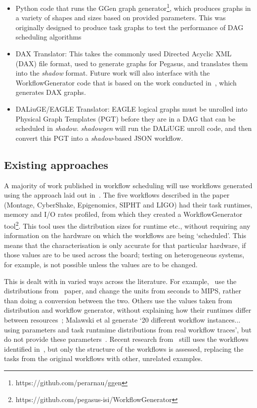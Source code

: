 \documentclass{article}
\begin{document}
\begin{multicols}{2}
\begin{itemize}
	\item Python code that runs the GGen graph
	generator\footnote{https://github.com/perarnau/ggen}, which produces graphs in a variety of shapes and sizes based on provided parameters. This was originally designed to produce task graphs to test the performance of DAG scheduling algorithms
	\item DAX Translator: This takes the commonly used Directed Acyclic XML (DAX)
	file format, used to generate graphs for Pegasus, and translates them into
	the \textit{shadow} format. Future work will also interface with the
	WorkflowGenerator code that is based on the work conducted
	in~\cite{bharathi2008}, which generates DAX graphs. 
	\item DALiuGE/EAGLE Translator: EAGLE logical graphs must be unrolled into
	Physical Graph Templates (PGT) before they are in a DAG that can be scheduled in
	\textit{shadow}. \textit{shadowgen} will run the DALiUGE unroll code, and then
	convert this PGT into a \textit{shadow}-based JSON workflow. 
\end{itemize}


\subsection*{Existing approaches}
\label{ssec:existing}
A majority of work published in workflow scheduling will use workflows
generated using the approach laid out in~\cite{bharathi2008}. The five
workflows described in the paper (Montage, CyberShake, Epigenomics, SIPHT and
LIGO) had their task runtimes, memory and I/O rates profiled, from which they
created a WorkflowGenerator
tool\footnote{https://github.com/pegasus-isi/WorkflowGenerator}. This tool
uses the distribution sizes for runtime etc., without requiring any
information on the hardware on which the workflows are being `scheduled'. This
means that the characterisation is only accurate for that particular hardware,
if those values are to be used across the board; testing on heterogeneous
systems, for example, is not possible unless the values are to be changed.

This is dealt with in varied ways across the literature. For
example,~\cite{rodriguez2018} use the distributions
from~\cite{bharathi2008} paper, and change the units from seconds to MIPS,
rather than doing a conversion between the two. Others use the values taken
from distribution and workflow generator, without explaining how their
runtimes differ between resources~\cite{abrishami2013,malawski2015}; Malawski
et al generate `20 different workflow instances...
using parameters and task runtmime distributions from real workflow
traces', but do not provide these parameters~\cite{malawski2015}.  Recent
research from~\cite{wang2019} still uses the workflows identified in~\cite{bharathi2008,juve2013},
but only the structure of the workflows is assessed, replacing the tasks from
the original workflows with other, unrelated examples.


\end{multicols}
\end{document}
